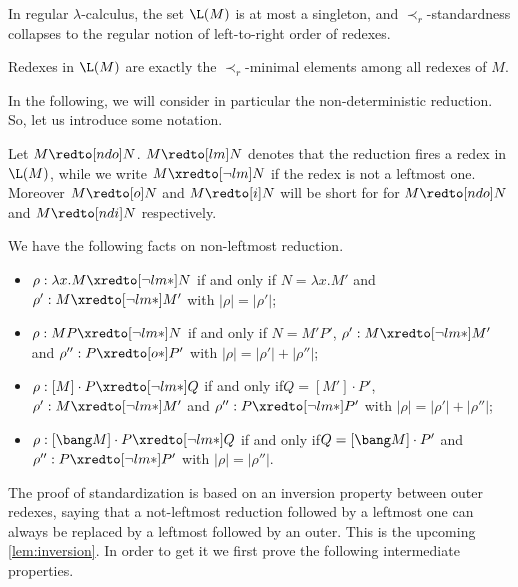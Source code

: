 In regular $\lambda$-calculus, the set $\L(M)$ is at most a singleton, and
$\prec_r$-standardness collapses to the regular notion of left-to-right order of redexes.

\begin{fact}
  Redexes in $\L(M)$ are exactly the $\prec_r$-minimal elements among
  all redexes of $M$.
\end{fact}

In the following, we will consider in particular the non-deterministic reduction. So, let us introduce some notation.

\begin{notation}
Let $M \redto[ndo] N$.
$M\redto[lm]N$ denotes that the reduction fires a
redex in $\L(M)$, while we write $M\xredto[\neg lm]N$ if the redex
is not a leftmost one. Moreover $M\redto[o]N$ and $M\redto[i]N$ will be short for 
for $M\redto[ndo]N$ and $M\redto[ndi]N$ respectively.

\end{notation}

\begin{lemma}\label{lem:rightpushing}
We have the following facts on non-leftmost reduction.
\begin{itemize}
\item $\rho:\lambda x.M \xredto[\neg lm*] N$ if and only if $N = \lambda x.M'$
  and $\rho':M \xredto[\neg lm*] M'$ with $|\rho| = |\rho'|$;
\item $\rho:MP \xredto[\neg lm*] N$ if and only if $N = M'P'$, $\rho':M
  \xredto[\neg lm*] M'$ and $\rho'':P \xredto[o*] P'$ with $|\rho| =
  |\rho'| + |\rho''|$;
\item $\rho: [M]\cdot P \xredto[\neg lm*] Q$  if and only if$Q = [M']\cdot P'$,
  $\rho':M \xredto[\neg lm*] M'$ and $\rho'':P \xredto[\neg lm*] P'$
  with $|\rho| = |\rho'| + |\rho''|$;
\item $\rho: [\bang M]\cdot P \xredto[\neg lm*] Q$  if and only if$Q = [\bang
  M]\cdot P'$ and $\rho'':P \xredto[\neg lm*] P'$ with $|\rho| =
  |\rho''|$.
\end{itemize}
\end{lemma}
The proof of standardization is based on an inversion property between outer redexes,
saying that a not-leftmost reduction followed by a leftmost one can always be replaced by a leftmost followed by 
an outer. This is the upcoming \autoref{lem:inversion}. In order to get it we first prove the following intermediate properties.

